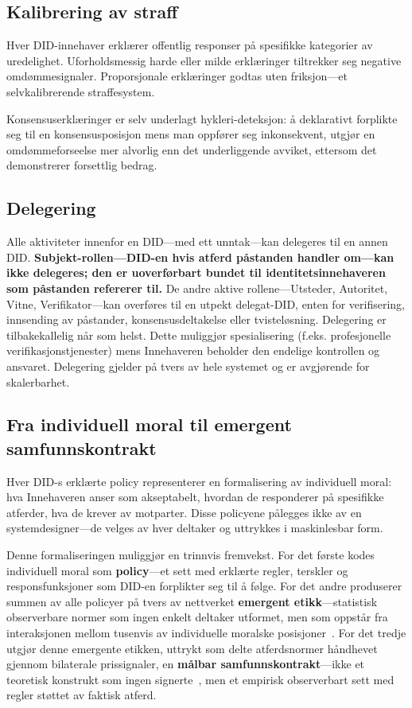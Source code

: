 \documentclass[11pt,a4paper,twocolumn]{article}
\begin{document}
\subsection{Kalibrering av straff}

Hver DID-innehaver erklærer offentlig responser på spesifikke kategorier av uredelighet. Uforholdsmessig harde eller milde erklæringer tiltrekker seg negative omdømmesignaler. Proporsjonale erklæringer godtas uten friksjon---et selvkalibrerende straffesystem.

Konsensuserklæringer er selv underlagt hykleri-deteksjon: å deklarativt forplikte seg til en konsensusposisjon mens man oppfører seg inkonsekvent, utgjør en omdømmeforseelse mer alvorlig enn det underliggende avviket, ettersom det demonstrerer forsettlig bedrag.

\subsection{Delegering}

Alle aktiviteter innenfor en DID---med ett unntak---kan delegeres til en annen DID. \textbf{Subjekt-rollen---DID-en hvis atferd påstanden handler om---kan ikke delegeres; den er uoverførbart bundet til identitetsinnehaveren som påstanden refererer til.} De andre aktive rollene---Utsteder, Autoritet, Vitne, Verifikator---kan overføres til en utpekt delegat-DID, enten for verifisering, innsending av påstander, konsensusdeltakelse eller tvisteløsning. Delegering er tilbakekallelig når som helst. Dette muliggjør spesialisering (f.eks. profesjonelle verifikasjonstjenester) mens Innehaveren beholder den endelige kontrollen og ansvaret. Delegering gjelder på tvers av hele systemet og er avgjørende for skalerbarhet.

\subsection{Fra individuell moral til emergent samfunnskontrakt}

Hver DID-s erklærte policy representerer en formalisering av individuell moral: hva Innehaveren anser som akseptabelt, hvordan de responderer på spesifikke atferder, hva de krever av motparter. Disse policyene pålegges ikke av en systemdesigner---de velges av hver deltaker og uttrykkes i maskinlesbar form.

Denne formaliseringen muliggjør en trinnvis fremvekst. For det første kodes individuell moral som \textbf{policy}---et sett med erklærte regler, terskler og responsfunksjoner som DID-en forplikter seg til å følge. For det andre produserer summen av alle policyer på tvers av nettverket \textbf{emergent etikk}---statistisk observerbare normer som ingen enkelt deltaker utformet, men som oppstår fra interaksjonen mellom tusenvis av individuelle moralske posisjoner~\cite{durkheim1893}. For det tredje utgjør denne emergente etikken, uttrykt som delte atferdsnormer håndhevet gjennom bilaterale prissignaler, en \textbf{målbar samfunnskontrakt}---ikke et teoretisk konstrukt som ingen signerte~\cite{rawls1971}, men et empirisk observerbart sett med regler støttet av faktisk atferd.
\end{document}
